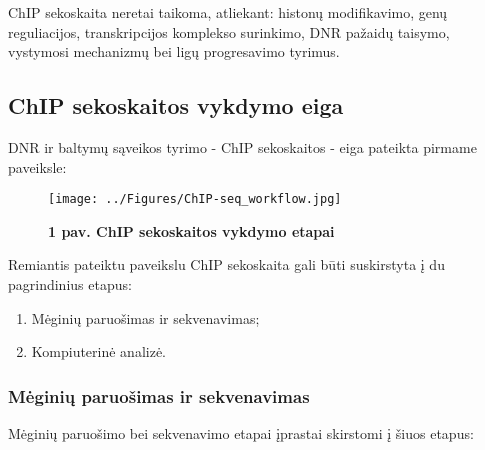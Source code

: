 \documentclass[12pt]{article}
\begin{document}
ChIP sekoskaita neretai taikoma, atliekant: histonų modifikavimo, genų
reguliacijos, transkripcijos komplekso surinkimo, DNR pažaidų taisymo,
vystymosi mechanizmų bei ligų progresavimo tyrimus.


\subsection{ChIP sekoskaitos vykdymo eiga}

DNR ir baltymų sąveikos tyrimo - ChIP sekoskaitos - eiga pateikta pirmame
paveiksle:

\begin{figure}[ht]
    \begin{center}
        \texttt{[image: ../Figures/ChIP-seq\_workflow.jpg]}
        \vspace{-1\baselineskip}
        \caption*{\small\textbf{1 pav. ChIP sekoskaitos vykdymo etapai}}
    \end{center}
\end{figure}

Remiantis pateiktu paveikslu ChIP sekoskaita gali būti suskirstyta į du
pagrindinius etapus:

\begin{enumerate}
    \item Mėginių paruošimas ir sekvenavimas;
    \item Kompiuterinė analizė.
\end{enumerate}

\subsubsection{Mėginių paruošimas ir sekvenavimas}
Mėginių paruošimo bei sekvenavimo etapai įprastai skirstomi į šiuos etapus:
\end{document}
